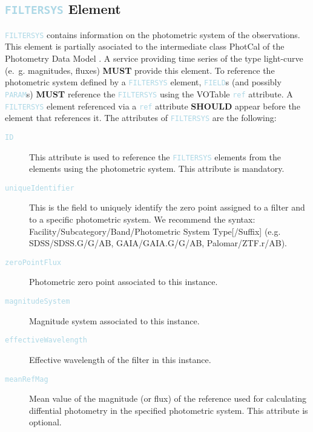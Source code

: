 \documentclass[11pt,a4paper]{ivoa}
\newcommand\elem[1]{\textcolor{LightBlue}{{\tt#1}}}
\begin{document}
\subsection{\elem{FILTERSYS} Element}
\elem{FILTERSYS} contains information on the photometric system of the observations. This element is partially asociated to the intermediate class PhotCal of the Photometry Data Model \cite{PhotometryDM}. A service providing time series of the type light-curve (e.~g. magnitudes, fluxes) \textbf{MUST} provide this element. To reference the photometric system defined by a \elem{FILTERSYS} element, \elem{FIELD}s (and possibly \elem{PARAM}s) \textbf{MUST} reference the \elem{FILTERSYS} using the VOTable \elem{ref} attribute. A \elem{FILTERSYS} element referenced via a \elem{ref} attribute \textbf{SHOULD} appear before the element that references it. The attributes of \elem{FILTERSYS} are the following: 
\begin{description}
     \item[\elem{ID}] This attribute is used to reference the \elem{FILTERSYS} elements from the elements using the photometric system. This attribute is mandatory. 
     \item[\elem{uniqueIdentifier}] This is the field to uniquely identify the zero point assigned to a filter and to a specific photometric system. We recommend the syntax: Facility/Subcategory/Band/Photometric System Type[/Suffix] (e.g. SDSS/SDSS.G/G/AB, GAIA/GAIA.G/G/AB, Palomar/ZTF.r/AB). 
     \item[\elem{zeroPointFlux}] Photometric zero point associated to this instance. 
     \item[\elem{magnitudeSystem}] Magnitude system associated to this instance.
     \item[\elem{effectiveWavelength}] Effective wavelength of the filter in this instance. 
     \item[\elem{meanRefMag}] Mean value of the magnitude (or flux) of the reference used for calculating diffential photometry in the specified photometric system. This attribute is optional.  
\end{description}
\end{document}
